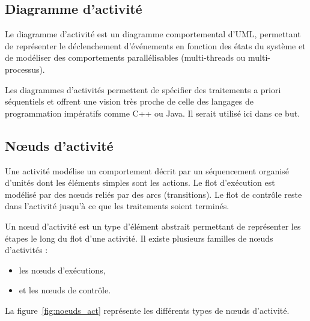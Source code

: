 \documentclass[11pt,a4paper]{paper}
\begin{document}
\newpage
\begin{appendices}

\section{Diagramme d'activité} 
\label{ann:diag_act}

\vspace{2mm}

Le diagramme d'activité est un diagramme comportemental d'UML, permettant de représenter le déclenchement d'événements en fonction des états du système et de modéliser des comportements parallélisables (multi-threads ou multi-processus).

Les diagrammes d'activités permettent de spécifier des traitements a priori séquentiels et offrent une vision très proche de celle des langages de programmation impératifs comme C++ ou Java. Il serait utilisé ici dans ce but.

\subsection{N{\oe}uds d'activité}

Une activité modélise un comportement décrit par un séquencement organisé d'unités dont les éléments simples sont les actions. Le flot d'exécution est modélisé par des n{\oe}uds reliés par des arcs (transitions). Le flot de contrôle reste dans l'activité jusqu'à ce que les traitements soient terminés.

Un n{\oe}ud d'activité est un type d'élément abstrait permettant de représenter les étapes le long du flot d'une activité. Il existe plusieurs familles de n{\oe}uds d'activités :
\begin{itemize}
\item les n{\oe}uds d'exécutions,
\item et les n{\oe}uds de contrôle.
\end{itemize}
La figure~\ref{fig:noeuds_act} représente les différents types de n{\oe}uds d'activité.


\end{appendices}
\end{document}
